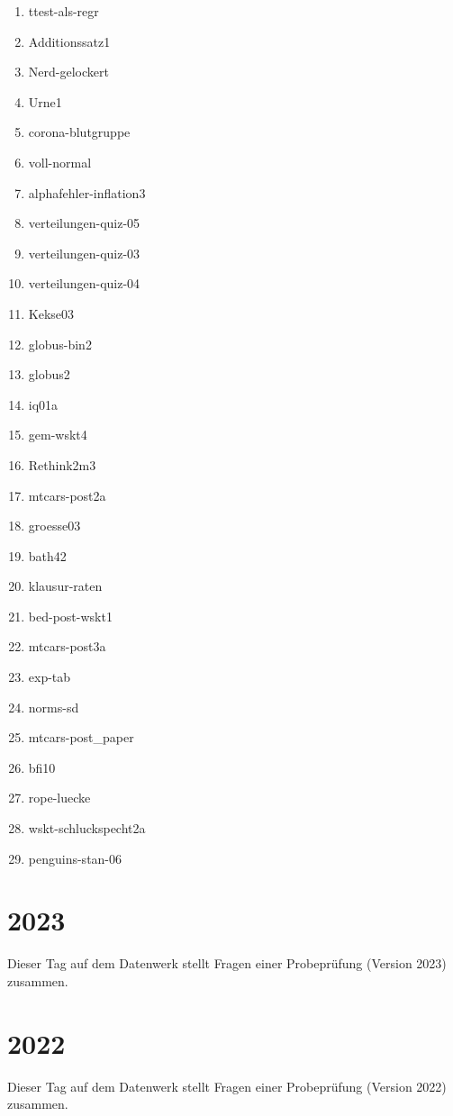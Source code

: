 \documentclass[
  ngerman,
  letterpaper,
  twoside,
  open=any]{scrbook}
\providecommand{\tightlist}{%
  \setlength{\itemsep}{0pt}\setlength{\parskip}{0pt}}\usepackage{longtable,booktabs,array}
\theoremstyle{definition}
\theoremstyle{plain}
\theoremstyle{definition}
\theoremstyle{definition}
\theoremstyle{definition}
\theoremstyle{definition}
\theoremstyle{remark}
\begin{document}
\begin{enumerate}
\def\labelenumi{\arabic{enumi}.}
\tightlist
\item
  ttest-als-regr
\item
  Additionssatz1
\item
  Nerd-gelockert
\item
  Urne1
\item
  corona-blutgruppe
\item
  voll-normal
\item
  alphafehler-inflation3
\item
  verteilungen-quiz-05
\item
  verteilungen-quiz-03
\item
  verteilungen-quiz-04
\item
  Kekse03
\item
  globus-bin2
\item
  globus2
\item
  iq01a
\item
  gem-wskt4
\item
  Rethink2m3
\item
  mtcars-post2a
\item
  groesse03
\item
  bath42
\item
  klausur-raten
\item
  bed-post-wskt1
\item
  mtcars-post3a
\item
  exp-tab
\item
  norms-sd
\item
  mtcars-post\_paper
\item
  bfi10
\item
  rope-luecke
\item
  wskt-schluckspecht2a
\item
  penguins-stan-06
\end{enumerate}

\section{2023}\label{section-18}

Dieser Tag auf dem Datenwerk stellt Fragen einer Probeprüfung (Version
2023) zusammen.

\section{2022}\label{section-19}

Dieser Tag auf dem Datenwerk stellt Fragen einer Probeprüfung (Version
2022) zusammen.
\end{document}
